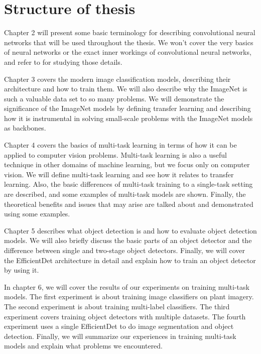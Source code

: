 \section{Structure of thesis}
Chapter 2 will present some basic terminology for describing convolutional neural networks that will be used throughout the thesis.
We won't cover the very basics of neural networks or the exact inner workings of convolutional neural networks, and refer to \citep{deep-learning} for studying those details.

Chapter 3 covers the modern image classification models, describing their architecture and how to train them.
We will also describe why the ImageNet is such a valuable data set to so many problems.
We will demonstrate the significance of the ImageNet models by defining transfer learning and describing how it is instrumental in solving small-scale problems with the ImageNet models as backbones.

Chapter 4 covers the basics of multi-task learning in terms of how it can be applied to computer vision problems.
Multi-task learning is also a useful technique in other domains of machine learning, but we focus only on computer vision. 
We will define multi-task learning and see how it relates to transfer learning.
Also, the basic differences of multi-task training to a single-task setting are described, and some examples of multi-task models are shown.
Finally, the theoretical benefits and issues that may arise are talked about and demonstrated using some examples.

Chapter 5 describes what object detection is and how to evaluate object detection models.
We will also briefly discuss the basic parts of an object detector and the difference between single and two-stage object detectors.
Finally, we will cover the EfficientDet architecture in detail and explain how to train an object detector by using it.

In chapter 6, we will cover the results of our experiments on training multi-task models.
The first experiment is about training image classifiers on plant imagery.
The second experiment is about training multi-label classifiers.
The third experiment covers training object detectors with multiple datasets.
The fourth experiment uses a single EfficientDet to do image segmentation and object detection.
Finally, we will summarize our experiences in training multi-task models and explain what problems we encountered.

